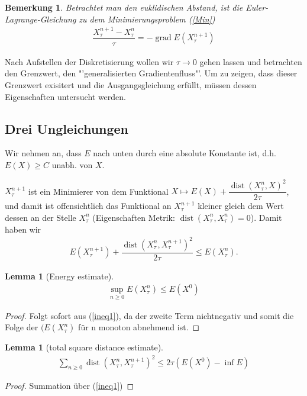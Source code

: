 \documentclass[11pt,a4paper,notitlepage]{scrreprt}
\newcommand{\dist}{\operatorname{dist}}
\newcommand{\grad}{\operatorname{grad}}
\newtheorem{lem}[defi]{Lemma}
\newtheorem{bem}[defi]{Bemerkung}
\begin{document}
\begin{bem}
Betrachtet man den euklidischen Abstand, ist die Euler-Lagrange-Gleichung zu dem Minimierungsproblem (\ref{Min})
\begin{eqnarray*}
\dfrac{X_\tau^{n+1}-X_\tau^n}{\tau}=-\grad E(X_\tau^{n+1})
\end{eqnarray*}
\end{bem}

Nach Aufstellen der Diskretisierung wollen wir $\tau \to 0$ gehen lassen und betrachten den Grenzwert, den "'generalisierten Gradientenfluss"'.
Um zu zeigen, dass dieser Grenzwert exisitert und die Ausgangsgleichung erfüllt, müssen dessen Eigenschaften untersucht werden. 

\subsection{Drei Ungleichungen}
Wir nehmen an, dass $E$ nach unten durch eine absolute Konstante ist, d.h. $E(X)\geq C$ unabh. von $X$.
\newline


$X_\tau^{n+1}$ ist ein Minimierer von dem Funktional $X \mapsto E(X)+\dfrac{\dist(X_\tau^n,X)^2}{2\tau}$, und damit ist offensichtlich das Funktional an $X_\tau^{n+1}$ kleiner gleich dem Wert dessen an der Stelle $X_\tau^n$ (Eigenschaften Metrik: $\dist(X_\tau^n,X_\tau^n)=0$). Damit haben wir
\begin{eqnarray}
E(X_\tau^{n+1})+\dfrac{\dist(X_\tau^n,X_\tau^{n+1})^2}{2\tau}\leq E(X_\tau^n). \label{ineq1}
\end{eqnarray} 
\begin{lem}[Energy estimate]
\begin{eqnarray}
\sup_{n\geq 0}E(X_\tau^n)\leq E(X^0) \label{enest}
\end{eqnarray}
\end{lem}
\begin{proof}
Folgt sofort aus (\ref{ineq1}), da der zweite Term nichtnegativ und somit die Folge der $(E(X_\tau^n)$ für n monoton abnehmend ist. 
\end{proof}

\begin{lem}[total square distance estimate]
\begin{eqnarray}
\sum_{n\geq 0}\dist(X_\tau^n,X_\tau^{n+1})^2\leq 2\tau (E(X^0)-\inf E)\label{totalsquare}
\end{eqnarray}
\end{lem}
\begin{proof}
Summation über (\ref{ineq1})
\end{proof}
\end{document}
